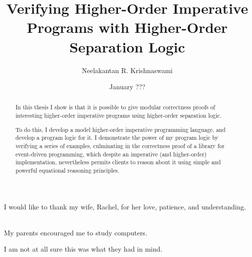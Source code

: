 \documentclass[12pt]{cmuthesis}
\begin{document}
 
\frontmatter

\pagestyle{fancyplain}

\title{ %
{\bf Verifying Higher-Order Imperative Programs with Higher-Order Separation Logic}}
\author{Neelakantan R. Krishnaswami}
\date{January ???}
\trnumber{}


\support{}
\disclaimer{}



\maketitle

\begin{dedication}
I would like to thank my wife, Rachel, for her love, patience, and
understanding. 

\ \\

My parents encouraged me to study computers.

I am not at all sure this was what they had in mind. 
\end{dedication}

 

\pagestyle{fancyplain}
\renewcommand{\chaptermark}[1]{\markboth{#1}{}}
 
\lhead{\fancyplain{}{\thepage} --- \texttt{}}
\chead{}
\rhead{\fancyplain{}{\textit{\leftmark}}}
\lfoot{}
\cfoot{}
\rfoot{}




\begin{abstract}
In this thesis I show is that it is possible to give modular
correctness proofs of interesting higher-order imperative programs
using higher-order separation logic.

To do this, I develop a model higher-order imperative programming
language, and develop a program logic for it. I demonstrate the power
of my program logic by verifying a series of examples, culminating in
the correctness proof of a library for event-driven programming, which
despite an imperative (and higher-order) implementation, nevertheless
permits clients to reason about it using simple and powerful
equational reasoning principles.
\end{abstract}
\end{document}
